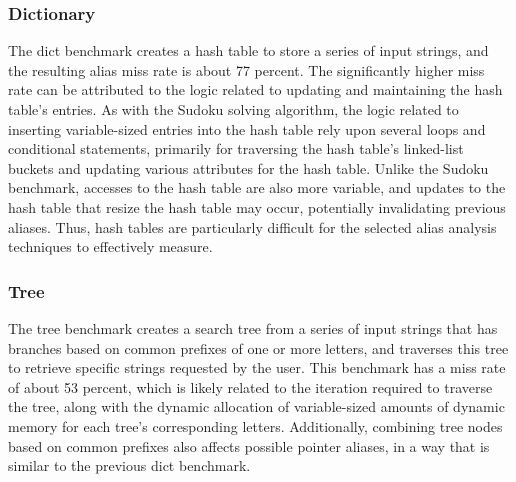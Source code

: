 \subsubsection{Dictionary}
The dict benchmark creates a hash table to store a series of input strings, and the resulting alias miss rate is about 77 percent. The significantly higher miss rate can be attributed to the logic related to updating and maintaining the hash table's entries. As with the Sudoku solving algorithm, the logic related to inserting variable-sized entries into the hash table rely upon several loops and conditional statements, primarily for traversing the hash table's linked-list buckets and updating various attributes for the hash table. Unlike the Sudoku benchmark, accesses to the hash table are also more variable, and updates to the hash table that resize the hash table may occur, potentially invalidating previous aliases. Thus, hash tables are particularly difficult for the selected alias analysis techniques to effectively measure.

\subsubsection{Tree}
The tree benchmark creates a search tree from a series of input strings that has branches based on common prefixes of one or more letters, and traverses this tree to retrieve specific strings requested by the user. This benchmark has a miss rate of about 53 percent, which is likely related to the iteration required to traverse the tree, along with the dynamic allocation of variable-sized amounts of dynamic memory for each tree's corresponding letters. Additionally, combining tree nodes based on common prefixes also affects possible pointer aliases, in a way that is similar to the previous dict benchmark.

